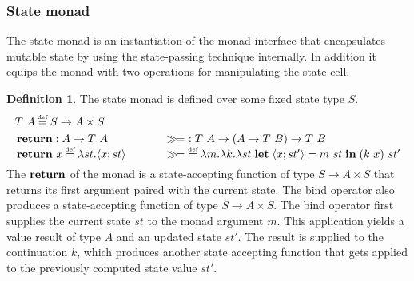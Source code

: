 \documentclass[12pt,phd,lfcs,twoside,openright,logo,leftchapter,normalheadings]{infthesis}
\theoremstyle{plain}
\theoremstyle{definition}
\newtheorem{definition}[theorem]{Definition}
\begin{document}
\subsubsection{State monad}
%
The state monad is an instantiation of the monad interface that
encapsulates mutable state by using the state-passing technique
internally. In addition it equips the monad with two operations for
manipulating the state cell.
%
\begin{definition}\label{def:state-monad}
  The state monad is defined over some fixed state type $S$.
  \[
    \ba{@{~}l@{\qquad\quad}@{~}r}
      \multicolumn{2}{l}{T~A \defas S \to A \times S} \smallskip\\
      \multirow{2}{*}{
        \bl
         \Return : A \to T~A\\
         \Return~x\defas \lambda st.\Record{x;st}
        \el} &
      \multirow{2}{*}{
        \bl
          \bind ~: T~A \to (A \to T~B) \to T~B\\
          \bind ~\defas \lambda m.\lambda k.\lambda st. \Let\;\Record{x;st'} = m~st\;\In\; (k~x)~st'
          \el} \\ & %
    \ea
  \]
  The $\mathbf{return}$ of the monad is a state-accepting function of type
  $S \to A \times S$ that returns its first argument paired with the
  current state. The bind operator also produces a state-accepting
  function of type $S \to A \times S$. The bind operator first
  supplies the current state $st$ to the monad argument $m$. This
  application yields a value result of type $A$ and an updated state
  $st'$. The result is supplied to the continuation $k$, which
  produces another state accepting function that gets applied to the
  previously computed state value $st'$.


\end{definition}
\end{document}
